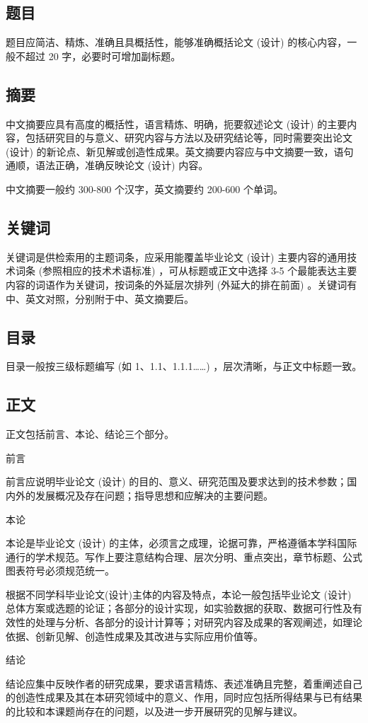 \subsection{题目}
题目应简洁、精炼、准确且具概括性，能够准确概括论文 (设计) 的核心内容，一般不超过 20 字，必要时可增加副标题。
\subsection{摘要}
中文摘要应具有高度的概括性，语言精炼、明确，扼要叙述论文 (设计) 的主要内容，包括研究目的与意义、研究内容与方法以及研究结论等，同时需要突出论文 (设计) 的新论点、新见解或创造性成果。英文摘要内容应与中文摘要一致，语句通顺，语法正确，准确反映论文 (设计) 内容。

中文摘要一般约 300-800 个汉字，英文摘要约 200-600 个单词。
\subsection{关键词}
关键词是供检索用的主题词条，应采用能覆盖毕业论文 (设计) 主要内容的通用技术词条 (参照相应的技术术语标准) ，可从标题或正文中选择 3-5 个最能表达主要内容的词语作为关键词，按词条的外延层次排列 (外延大的排在前面) 。关键词有中、英文对照，分别附于中、英文摘要后。
\subsection{目录}
目录一般按三级标题编写 (如 1、1.1、1.1.1……) ，层次清晰，与正文中标题一致。
\subsection{正文}
正文包括前言、本论、结论三个部分。
\begin{compactenum}
\item 前言

前言应说明毕业论文 (设计) 的目的、意义、研究范围及要求达到的技术参数；国内外的发展概况及存在问题；指导思想和应解决的主要问题。
\item 本论

本论是毕业论文 (设计) 的主体，必须言之成理，论据可靠，严格遵循本学科国际通行的学术规范。写作上要注意结构合理、层次分明、重点突出，章节标题、公式图表符号必须规范统一。

根据不同学科毕业论文(设计)主体的内容及特点，本论一般包括毕业论文 (设计) 总体方案或选题的论证；各部分的设计实现，如实验数据的获取、数据可行性及有效性的处理与分析、各部分的设计计算等；对研究内容及成果的客观阐述，如理论依据、创新见解、创造性成果及其改进与实际应用价值等。
\item 结论

结论应集中反映作者的研究成果，要求语言精炼、表述准确且完整，着重阐述自己的创造性成果及其在本研究领域中的意义、作用，同时应包括所得结果与已有结果的比较和本课题尚存在的问题，以及进一步开展研究的见解与建议。
\end{compactenum}
